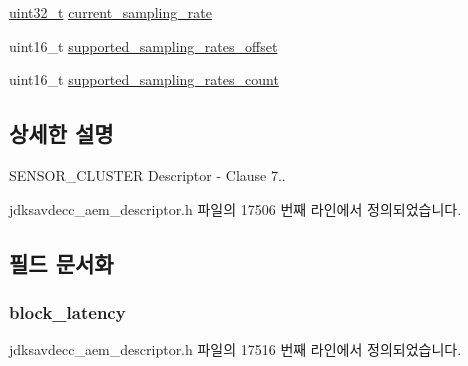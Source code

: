 \begin{DoxyCompactItemize}
\item 
\hyperlink{parse_8c_a6eb1e68cc391dd753bc8ce896dbb8315}{uint32\+\_\+t} \hyperlink{structjdksavdecc__descriptor__sensor__unit__cluster_a081e14c5c832a659daf22003ed8e918d}{current\+\_\+sampling\+\_\+rate}
\item 
uint16\+\_\+t \hyperlink{structjdksavdecc__descriptor__sensor__unit__cluster_a07e4720cf58229a78c3c0939837b6228}{supported\+\_\+sampling\+\_\+rates\+\_\+offset}
\item 
uint16\+\_\+t \hyperlink{structjdksavdecc__descriptor__sensor__unit__cluster_a976ed67e20174bbc1a9988dc8f577fd8}{supported\+\_\+sampling\+\_\+rates\+\_\+count}
\end{DoxyCompactItemize}


\subsection{상세한 설명}
S\+E\+N\+S\+O\+R\+\_\+\+C\+L\+U\+S\+T\+ER Descriptor -\/ Clause 7.. 

jdksavdecc\+\_\+aem\+\_\+descriptor.\+h 파일의 17506 번째 라인에서 정의되었습니다.



\subsection{필드 문서화}
\subsubsection[{\texorpdfstring{block\+\_\+latency}{block_latency}}]{ block\+\_\+latency}\hypertarget{structjdksavdecc__descriptor__sensor__unit__cluster_ae2e9f0088d5e900b610d1b2818dfc559}{}\label{structjdksavdecc__descriptor__sensor__unit__cluster_ae2e9f0088d5e900b610d1b2818dfc559}


jdksavdecc\+\_\+aem\+\_\+descriptor.\+h 파일의 17516 번째 라인에서 정의되었습니다.

